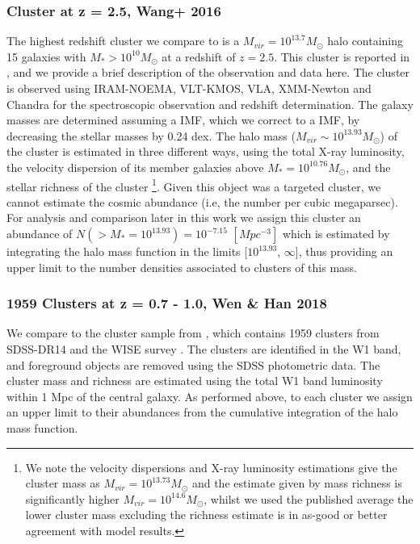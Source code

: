 \subsubsection{Cluster at z = 2.5, Wang+ 2016}
\label{subsubsec:Wang}
The highest redshift cluster we compare to is a $M_{vir} = 10^{13.7} M_{\odot}$ halo containing 15 galaxies with $M_* > 10^{10} M_{\odot}$ at a redshift of $z = 2.5$.
This cluster is reported in \citet{Wang2016DISCOVERY2.506}, and we provide a brief description of the observation and data here.
The cluster is observed using IRAM-NOEMA, VLT-KMOS, VLA, XMM-Newton and Chandra for the spectroscopic observation and redshift determination.  
The galaxy masses are determined assuming a \citet{Salpeter1955TheEvolution.} IMF, which we correct to a \citet{Chabrier2003GalacticFunction} IMF, by decreasing the stellar masses by 0.24 dex.
The halo mass ($M_{vir} \sim 10^{13.93} M_{\odot}$) of the cluster is estimated in three different ways, using the total X-ray luminosity, the velocity dispersion of its member galaxies above $M_* = 10^{10.76} M_{\odot}$, and the stellar richness of the cluster \footnote{We note the velocity dispersions and X-ray luminosity estimations give the cluster mass as $M_{vir} = 10^{13.73} M_{\odot}$ and the estimate given by mass richness is significantly higher $M_{vir} = 10^{14.6} M_{\odot}$, whilst we used the published average the lower cluster mass excluding the richness estimate is in as-good or better agreement with model results.}. Given this object was a targeted cluster, we cannot estimate the cosmic abundance (i.e, the number per cubic megaparsec). For analysis and comparison later in this work we assign this cluster an abundance of $N(> M_*=10^{13.93})=10^{-7.15}$ $[Mpc^{-3}]$ which is estimated by integrating the halo mass function in the limits [$10^{13.93}$, $\infty$], thus providing an upper limit to the number densities associated to clusters of this mass. 

\subsubsection{1959 Clusters at z = 0.7 - 1.0, Wen \& Han 2018}
\label{subsubsec:1959}
We compare to the cluster sample from \citet{Wen2018ARedshifts}, which contains 1959 clusters from SDSS-DR14 \citep{Abolfathi2017TheExperiment} and the WISE survey \citep{Wright2010THEPERFORMANCE}. The clusters are identified in the W1 band, and foreground objects are removed using the SDSS photometric data. The cluster mass and richness are estimated using the total W1 band luminosity within 1 Mpc of the central galaxy. As performed above, to each cluster we assign an upper limit to their abundances from the cumulative integration of the halo mass function.

